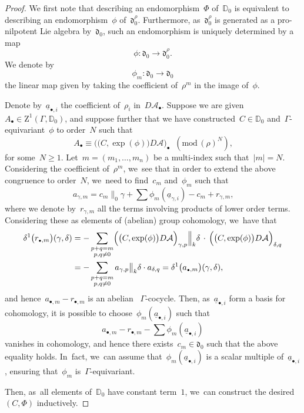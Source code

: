 \documentclass[JEP,XML,SOM,Unicode,published]{cedram}
\let\oldbullet\bullet
\renewcommand{\bullet}{{\scriptscriptstyle\oldbullet}}
\theoremstyle{plain}
\theoremstyle{definition}
\newcommand{\tx}{\text}
\newcommand{\nbd}{\nobreakdash-\hspace{0pt}}
\newcommand{\bbD}{\ensuremath{\mathbb{D}}}
\newcommand{\cA}{\ensuremath{\mathcal{A}}}
\newcommand{\frakd}{\ensuremath{\mathfrak{d}}}
\newcommand{\rmZ}{\ensuremath{\mathrm{Z}}}
\renewcommand{\pmod}[1]{\;(\mathrm{mod}\, #1)}
\let\Ga\Gamma
\let\ga\gamma
\begin{document}
\begin{proof}
We first note that describing an endomorphism~$\Phi$ of~$\bbD_0$ is equivalent to describing an endomorphism~$\phi$ of~$\frakd_0^\rho$. Furthermore, as~$\frakd_0^\rho$ is generated as a pro-nilpotent Lie algebra by~$\frakd_0$, such an endomorphism is uniquely determined by a map
\begin{equation*}
\phi:\frakd_0
\to
\frakd_0^\rho
\tx{.}
\end{equation*}
We denote by
\begin{equation*}
\phi_{m}: \frakd_0
\to
\frakd_0
\end{equation*}
the linear map given by taking the coefficient of~$\rho^m$ in the image of~$\phi$.

Denote by~$\underline{a}_{\bullet,i}$ the coefficient of~$\rho_i$ in~$D\cA_\bullet$. Suppose we are given~$A_\bullet\in\rmZ^1(\Ga,\bbD_0)$, and suppose further that we have constructed~$C\in\bbD_0$ and~$\Ga$\nbd{}equivariant~$\phi$ to order~$N$ such that
\begin{equation*}
A_\bullet
\equiv
\bigl(\bigl(C,\exp(\phi)\bigr)D\cA \bigr)_\bullet \;\pmod{(\rho)^{N}}
\tx{,}
\end{equation*}
for some~$N\geq 1$. Let~$m=(m_1,\ldots,m_n)$ be a multi-index such that~$|m|=N$. Considering the coefficient of~$\rho^m$, we~see that in order to extend the above congruence to order~$N$, we~need to find~$c_m$ and~$\phi_m$ such that
\begin{equation*}
a_{\ga,m}
=
c_m\big\|_0\ga + \sum \phi_m(\underline{a}_{\ga,i}) - c_m + r_{\ga,m}
\tx{,}
\end{equation*}
where we denote by~$r_{\ga,m}$ all the terms involving products of lower order terms. Considering these as elements of (abelian) group cohomology, we~have that
\begin{equation*}
\begin{aligned}
\delta^1\bigl(r_{\bullet,m}\bigr)(\ga,\delta)
&=
- \sum_{\substack{p+q=m\\ p,q\neq 0}}
\Bigl(\bigl(C,\exp(\phi)\bigr) D\cA \Bigr)_{\ga,p} \Big\|_k\delta
\mathbin{\,\cdot\,}
\Bigl(\bigl(C,\exp(\phi)\bigr) D\cA \Bigr)_{\delta,q}
\\
&=- \sum_{\substack{p+q=m\\ p,q\neq 0}} a_{\ga,p}\big\|_k\delta\cdot a_{\delta,q}
=
\delta^1\bigl(a_{\bullet,m}\bigr)(\ga,\delta)
\tx{,}
\end{aligned}
\end{equation*}
and hence~$a_{\bullet,m} -r_{\bullet,m}$ is an abelian ~$\Ga$\nbd{}cocycle. Then, as~$\underline{a}_{\bullet,i}$ form a basis for cohomology, it is possible to choose~$\phi_m(\underline{a}_{\bullet,i})$ such that
\begin{equation*}
a_{\bullet,m} - r_{\bullet,m} - \sum\phi_m(\underline{a}_{\bullet,i})
\end{equation*}
vanishes in cohomology, and hence there exists~$c_m\in\frakd_0$ such that the above equality holds. In~fact, we~can assume that~$\phi_m(\underline{a}_{\bullet,i})$ is a scalar multiple of~$\underline{a}_{\bullet,i}$, ensuring that~$\phi_m$ is~$\Ga$\nbd{}equivariant.

Then, as~all elements of~$\bbD_0$ have constant term~$1$, we~can construct the desired $(C,\Phi)$ inductively.
\end{proof}

\backmatter


\end{document}
